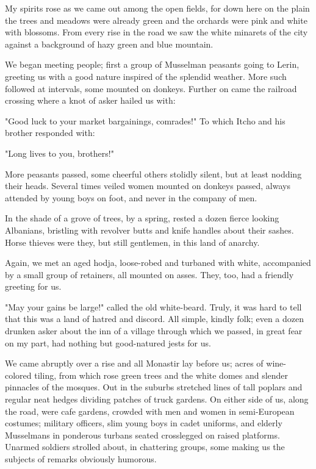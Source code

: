 \documentclass[a5paper,12pt]{book}
\begin{document}
My spirits rose as we came out among the open fields, for down here on the plain the trees and meadows were already green and the orchards were pink and white with blossoms. From every rise in the road we saw the white minarets of the city against a background of hazy green and blue mountain.

We began meeting people; first a group of Musselman peasants going to Lerin, greeting us with a good nature inspired of the splendid weather. More such followed at intervals, some mounted on donkeys. Further on came the railroad crossing where a knot of asker hailed us with:

"Good luck to your market bargainings, comrades!" To which Itcho and his brother responded with:

"Long lives to you, brothers!"

More peasants passed, some cheerful others stolidly silent, but at least nodding their heads. Several times veiled women mounted on donkeys passed, always attended by young boys on foot, and never in the company of men.

In the shade of a grove of trees, by a spring, rested a dozen fierce looking Albanians, bristling with revolver butts and knife handles about their sashes. Horse thieves were they, but still gentlemen, in this land of anarchy.

Again, we met an aged hodja, loose-robed and turbaned with white, accompanied by a small group of retainers, all mounted on asses. They, too, had a friendly greeting for us.

"May your gains be large!" called the old white-beard. Truly, it was hard to tell that this was a land of hatred and discord. All simple, kindly folk; even a dozen drunken asker about the inn of a village through which we passed, in great fear on my part, had nothing but good-natured jests for us.

We came abruptly over a rise and all Monastir lay before us; acres of wine-colored tiling, from which rose green trees and the white domes and slender pinnacles of the mosques. Out in the suburbs stretched lines of tall poplars and regular neat hedges dividing patches of truck gardens. On either side of us, along the road, were cafe gardens, crowded with men and women in semi-European costumes; military officers, slim young boys in cadet uniforms, and elderly Musselmans in ponderous turbans seated crosslegged on raised platforms. Unarmed soldiers strolled about, in chattering groups, some making us the subjects of remarks obviously humorous.
\end{document}
